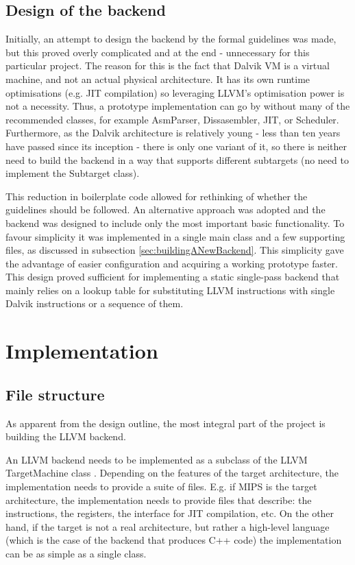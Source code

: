 \documentclass[parskip]{cs4rep}
\begin{document}
\subsection{Design of the backend} \label{sec:designOfTheBackend}

Initially, an attempt to design the backend by the formal guidelines\cite{P8} was made, but this proved overly complicated and at the end - unnecessary for this particular project. The reason for this is the fact that Dalvik VM is a virtual machine, and not an actual physical architecture. It has its own runtime optimisations (e.g. JIT compilation) so leveraging LLVM's optimisation power is not a necessity. Thus, a prototype implementation can go by without many of the recommended classes, for example AsmParser, Dissasembler, JIT, or Scheduler. Furthermore, as the Dalvik architecture is relatively young - less than ten years have passed since its inception - there is only one variant of it, so there is neither need to build the backend in a way that supports different subtargets (no need to implement the Subtarget class).

This reduction in boilerplate code allowed for rethinking of whether the guidelines should be followed. An alternative approach was adopted and the backend was designed to include only the most important basic functionality. To favour simplicity it was implemented in a single main class and a few supporting files, as discussed in subsection \ref{sec:buildingANewBackend}. This simplicity gave the advantage of easier configuration and acquiring a working prototype faster. This design proved sufficient for implementing a static single-pass backend that mainly relies on a lookup table for substituting LLVM instructions with single Dalvik instructions or a sequence of them.

\section{Implementation} \label{sec:Implementation}

\subsection{File structure}

As apparent from the design outline, the most integral part of the project is building the LLVM backend.

An LLVM backend needs to be implemented as a subclass of the LLVM TargetMachine class \cite{P8}. Depending on the features of the target architecture, the implementation needs to provide a suite of files. E.g. if MIPS is the target architecture, the implementation needs to provide files that describe: the instructions, the registers, the interface for JIT compilation, etc. On the other hand, if the target is not a real architecture, but rather a high-level language (which is the case of the backend that produces C++ code) the implementation can be as simple as a single class.
\end{document}
